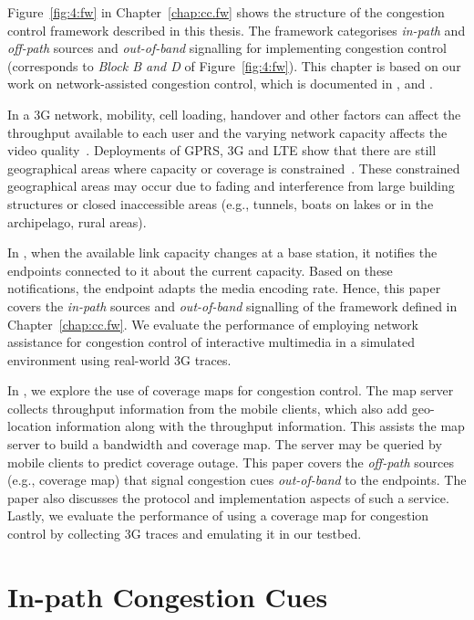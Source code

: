 Figure~\ref{fig:4:fw} in Chapter~\ref{chap:cc.fw} shows the structure of the
congestion control framework described in this thesis. The framework
categorises \emph{in-path} and \emph{off-path} sources and \emph{out-of-band}
signalling for implementing congestion control (corresponds to
\emph{Block B and D} of Figure~\ref{fig:4:fw}). This chapter is based on our
work on network-assisted congestion control, which is documented in
,  and \cite{glass:patent}.

In a 3G network, mobility, cell loading, handover and other factors can
affect the throughput available to each user and the varying network capacity
affects the video quality~\cite{diaz2007evaluating}. Deployments of GPRS, 3G
and LTE show that there are still geographical areas where capacity or
coverage is constrained~\cite{Curcio:glass, 6576402}. These constrained
geographical areas may occur due to fading and interference from large
building structures or closed inaccessible areas (e.g., tunnels, boats on
lakes or in the archipelago, rural areas).

In , when the available link capacity changes at a base
station, it notifies the endpoints connected to it about the current capacity.
Based on these notifications, the endpoint adapts the media encoding rate. Hence,
this paper covers the \emph{in-path} sources and \emph{out-of-band} signalling
of the framework defined in Chapter~\ref{chap:cc.fw}. We evaluate the
performance of employing network assistance for congestion control of interactive
multimedia in a simulated environment using real-world 3G traces.

In , we explore the use of coverage maps for congestion
control. The map server collects throughput information from the mobile
clients, which also add geo-location information along with the throughput
information. This assists the map server to build a bandwidth and coverage
map. The server may be queried by mobile clients to predict coverage outage.
This paper covers the \emph{off-path} sources (e.g., coverage map) that
signal congestion cues \emph{out-of-band} to the endpoints. The paper also
discusses the protocol and implementation aspects of such a service. Lastly,
we evaluate the performance of using a coverage map for congestion control by
collecting 3G traces and emulating it in our testbed.

\section{In-path Congestion Cues}


